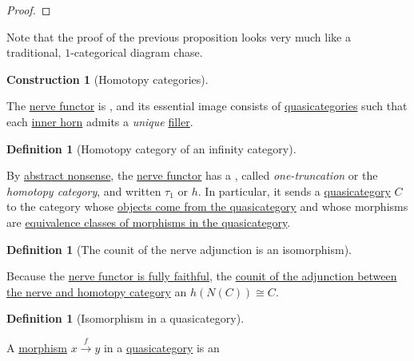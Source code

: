 \documentclass[oneside,a4paper]{book}%
\theoremstyle{definition}%
\newtheorem{definition}[theorem]{Definition}%
\newtheorem{construction}[theorem]{Construction}%
\begin{document}
\begin{Section}
\begin{Proposition}
\begin{proof}
  
  \end{proof}\end{Proposition}\par{}Note that the proof of the previous proposition looks very much like a
  traditional, \(1\)-categorical diagram chase.\begin{construction}[{Homotopy categories}]\begin{Proposition}\label{rs-008N}\par{}The \hyperref[rs-0088]{nerve functor} is  , and its
essential image consists of \hyperref[rs-008H]{quasicategories} such that each \hyperref[rs-008G]{inner
horn} admits a \emph{unique} \hyperref[rs-008D]{filler}.\end{Proposition}\begin{definition}[{Homotopy category of an infinity category}]\label{rs-008O}\par{}By \hyperref[rs-0089]{abstract nonsense}, the \hyperref[rs-0088]{nerve functor} has a , called \emph{one-truncation} or the \emph{homotopy category}, and
written \(\tau _1\) or \(h\). In particular, it sends a \hyperref[rs-008H]{quasicategory}
\(C\) to the category whose \hyperref[rs-008I]{objects come from the quasicategory} and
whose morphisms are \hyperref[rs-008L]{equivalence classes of morphisms in the
quasicategory}.\end{definition}\begin{definition}[{The counit of the nerve adjunction is an isomorphism}]\label{rs-008Q}\par{}Because the \hyperref[rs-008N]{nerve functor is fully faithful}, the \hyperref[rs-008O]{counit of the
adjunction between the nerve and homotopy category}  an
 \(h(N(C))\cong  C\).\end{definition}\end{construction}\begin{definition}[{Isomorphism in a quasicategory}]\label{rs-008J}\par{}A \hyperref[rs-008I]{morphism} \(x\xrightarrow {f} y\) in a \hyperref[rs-008H]{quasicategory} is an

\end{definition}
\end{Section}
\end{document}
